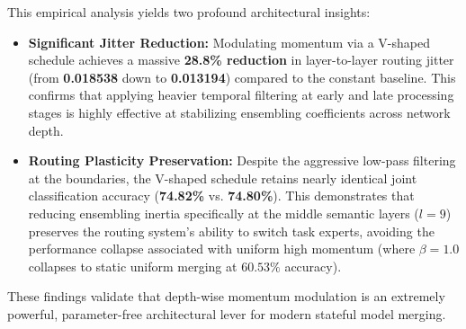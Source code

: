 \documentclass{article}
\theoremstyle{plain}
\theoremstyle{definition}
\theoremstyle{remark}
\begin{document}
    This empirical analysis yields two profound architectural insights:
    \begin{itemize}
    \item \textbf{Significant Jitter Reduction:} Modulating momentum via a V-shaped schedule achieves a massive \textbf{28.8\% reduction} in layer-to-layer routing jitter (from \textbf{0.018538} down to \textbf{0.013194}) compared to the constant baseline. This confirms that applying heavier temporal filtering at early and late processing stages is highly effective at stabilizing ensembling coefficients across network depth.
    \item \textbf{Routing Plasticity Preservation:} Despite the aggressive low-pass filtering at the boundaries, the V-shaped schedule retains nearly identical joint classification accuracy (\textbf{74.82\%} vs. \textbf{74.80\%}). This demonstrates that reducing ensembling inertia specifically at the middle semantic layers ($l=9$) preserves the routing system's ability to switch task experts, avoiding the performance collapse associated with uniform high momentum (where $\beta = 1.0$ collapses to static uniform merging at $60.53\%$ accuracy).
    \end{itemize}
    These findings validate that depth-wise momentum modulation is an extremely powerful, parameter-free architectural lever for modern stateful model merging.
\end{document}
